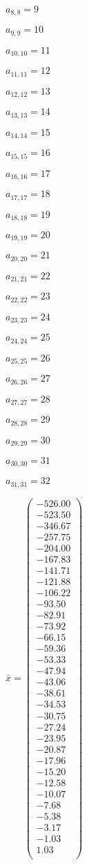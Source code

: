 \documentclass[a4paper,12pt]{article}
\begin{document}
$a _{ 8, 8 } = 9$

$a _{ 9, 9 } = 10$

$a _{ 10, 10 } = 11$

$a _{ 11, 11 } = 12$

$a _{ 12, 12 } = 13$

$a _{ 13, 13 } = 14$

$a _{ 14, 14 } = 15$

$a _{ 15, 15 } = 16$

$a _{ 16, 16 } = 17$

$a _{ 17, 17 } = 18$

$a _{ 18, 18 } = 19$

$a _{ 19, 19 } = 20$

$a _{ 20, 20 } = 21$

$a _{ 21, 21 } = 22$

$a _{ 22, 22 } = 23$

$a _{ 23, 23 } = 24$

$a _{ 24, 24 } = 25$

$a _{ 25, 25 } = 26$

$a _{ 26, 26 } = 27$

$a _{ 27, 27 } = 28$

$a _{ 28, 28 } = 29$

$a _{ 29, 29 } = 30$

$a _{ 30, 30 } = 31$

$a _{ 31, 31 } = 32$

$\bar { x } = \begin{pmatrix}
-526.00 \\
-523.50 \\
-346.67 \\
-257.75 \\
-204.00 \\
-167.83 \\
-141.71 \\
-121.88 \\
-106.22 \\
-93.50 \\
-82.91 \\
-73.92 \\
-66.15 \\
-59.36 \\
-53.33 \\
-47.94 \\
-43.06 \\
-38.61 \\
-34.53 \\
-30.75 \\
-27.24 \\
-23.95 \\
-20.87 \\
-17.96 \\
-15.20 \\
-12.58 \\
-10.07 \\
-7.68 \\
-5.38 \\
-3.17 \\
-1.03 \\
1.03 \\
\end{pmatrix}
$
\end{document}
